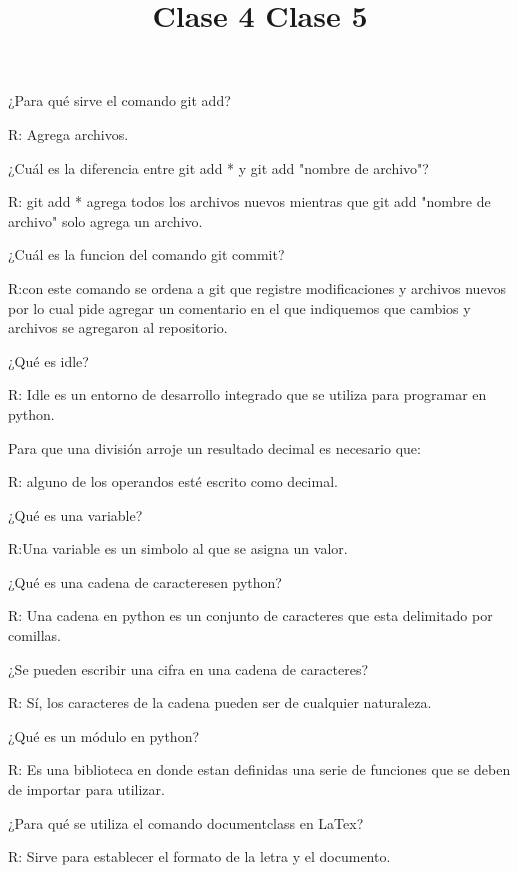 \documentclass[letter paper, 12pt, oneside]{article}
\begin{document}
¿Para qué sirve el comando git add?


R: Agrega archivos.


¿Cuál es la diferencia entre git add * y git add "nombre de archivo"?


R: git add * agrega todos los archivos nuevos mientras que git add "nombre de archivo" solo agrega un archivo. 


¿Cuál es la funcion del comando git commit?


R:con este comando se ordena a git que registre modificaciones y archivos nuevos por lo cual pide agregar un comentario en el que indiquemos que cambios y archivos se agregaron al repositorio.


\title{\huge\textbf{ Clase 4}}


¿Qué es idle? 


R: Idle es un entorno de desarrollo integrado que se utiliza para programar en python.


Para que una división arroje un resultado decimal es necesario que:


R: alguno de los operandos esté escrito como decimal. 


¿Qué es una variable?


R:Una variable es un simbolo al que se asigna un valor.



\title{\huge\textbf{ Clase 5}}


¿Qué es una cadena de caracteresen python?


R: Una cadena en python es un conjunto de caracteres que esta delimitado por comillas.

¿Se pueden escribir una cifra en una cadena de caracteres?


R: Sí, los caracteres de la cadena pueden ser de cualquier naturaleza.


¿Qué es un módulo en python?


R: Es una biblioteca en donde estan definidas una serie de funciones que se deben de importar para utilizar.


¿Para qué se utiliza el comando documentclass en LaTex?


R: Sirve para establecer el formato de la letra y el documento. 
\end{document}
